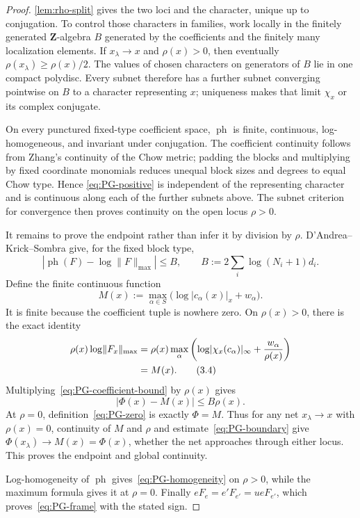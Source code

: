 \documentclass[11pt]{article}
\newcommand{\ph}{\operatorname{ph}}
\newcommand{\norm}[1]{\lVert#1\rVert}
\newcommand{\abs}[1]{\lvert#1\rvert}
\begin{document}
\begin{proof}
\cref{lem:rho-split} gives the two loci and the character, unique up to
conjugation.  To control those characters in families, work locally in the
finitely generated $\mathbf Z$-algebra $B$ generated by the coefficients
and the finitely many localization elements.  If $x_\lambda\to x$ and
$\rho(x)>0$, then eventually $\rho(x_\lambda)\geq\rho(x)/2$.  The values of
chosen characters on generators of $B$ lie in one compact polydisc.  Every
subnet therefore has a further subnet converging pointwise on $B$ to a
character representing $x$; uniqueness makes that limit $\chi_x$ or its
complex conjugate.

On every punctured fixed-type coefficient space,
$\ph$ is finite, continuous, log-homogeneous, and invariant under
conjugation.  The coefficient continuity follows from Zhang's continuity of
the Chow metric; padding the blocks and multiplying by fixed coordinate
monomials reduces unequal block sizes and degrees to equal Chow type.  Hence
\eqref{eq:PG-positive} is independent of the representing character and is
continuous along each of the further subnets above.  The subnet criterion for
convergence then proves continuity on the open locus $\rho>0$.

It remains to prove the endpoint rather than infer it by division by
$\rho$.  D'Andrea--Krick--Sombra give, for the fixed block type,
\begin{equation}
 \left|\ph(F)-\log\norm F_{\max}\right|\leq
 B,\qquad
 B:=2\sum_i\log(N_i+1)d_i.
\tag{3.3}\label{eq:PG-coefficient-bound}
\end{equation}
Define the finite continuous function
\[
 M(x):=\max_{\alpha\in S}
 \bigl(\log\abs{c_\alpha(x)}_x+w_\alpha\bigr).
\]
It is finite because the coefficient tuple is nowhere zero.  On
$\rho(x)>0$, there is the exact identity
\begin{align}
 \rho(x)\log\norm{F_x}_{\max}
 &=\rho(x)\max_\alpha\left(
 \log\abs{\chi_x(c_\alpha)}_\infty+
 \frac{w_\alpha}{\rho(x)}\right)\notag\\
 &=M(x).
\tag{3.4}\label{eq:PG-exact-max}
\end{align}
Multiplying~\eqref{eq:PG-coefficient-bound} by $\rho(x)$ gives
\begin{equation}
 \abs{\Phi(x)-M(x)}\leq B\rho(x).
\tag{3.5}\label{eq:PG-boundary}
\end{equation}
At $\rho=0$, definition~\eqref{eq:PG-zero} is exactly $\Phi=M$.  Thus for
any net $x_\lambda\to x$ with $\rho(x)=0$, continuity of $M$ and
$\rho$ and estimate~\eqref{eq:PG-boundary} give
$\Phi(x_\lambda)\to M(x)=\Phi(x)$, whether the net approaches through
either locus.  This proves the endpoint and global continuity.

Log-homogeneity of $\ph$ gives~\eqref{eq:PG-homogeneity} on
$\rho>0$, while the maximum formula gives it at $\rho=0$.  Finally
$eF_e=e'F_{e'}=ueF_{e'}$, which proves~\eqref{eq:PG-frame} with the
stated sign.
\end{proof}
\end{document}
